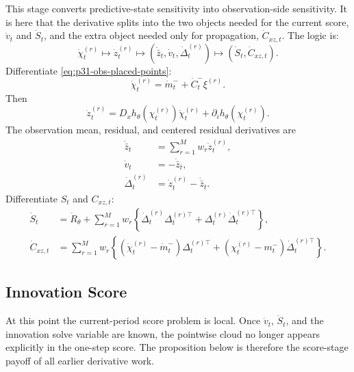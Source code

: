 \documentclass[11pt]{article}
\numberwithin{equation}{section}
\begin{document}
This stage converts predictive-state sensitivity into observation-side
sensitivity.  It is here that the derivative splits into the two objects needed
for the current score, \(\dot v_t\) and \(\dot S_t\), and the extra object
needed only for propagation, \(\dot C_{xz,t}\).  The logic is:
\begin{equation}
  \dot\chi_t^{(r)}
  \longmapsto
  \dot z_t^{(r)}
  \longmapsto
  (\dot{\bar z}_t,\dot v_t,\dot\Delta_t^{(r)})
  \longmapsto
  (\dot S_t,\dot C_{xz,t}).
  \label{eq:p32-observation-derivative-flow}
\end{equation}
Differentiate \eqref{eq:p31-obs-placed-points}:
\begin{equation}
  \dot\chi_t^{(r)}
  =
  \dot m_t^-+\dot C_t^-\xi^{(r)}.
  \label{eq:p31-dot-obs-place}
\end{equation}
Then
\begin{equation}
  \dot z_t^{(r)}
  =
  D_xh_\theta(\chi_t^{(r)})\dot\chi_t^{(r)}
  +\partial_i h_\theta(\chi_t^{(r)}).
  \label{eq:p31-dot-obs-value}
\end{equation}
The observation mean, residual, and centered residual derivatives are
\begin{align}
  \dot{\bar z}_t&=\sum_{r=1}^M w_r\dot z_t^{(r)},
  \label{eq:p31-dot-zbar}\\
  \dot v_t&=-\dot{\bar z}_t,
  \label{eq:p31-dot-v}\\
  \dot\Delta_t^{(r)}&=\dot z_t^{(r)}-\dot{\bar z}_t.
  \label{eq:p31-dot-Delta}
\end{align}
Differentiate \(S_t\) and \(C_{xz,t}\):
\begin{align}
  \dot S_t
  &=
  \dot R_\theta
  +
  \sum_{r=1}^M w_r
  \left\{
  \dot\Delta_t^{(r)}\Delta_t^{(r)\top}
  +\Delta_t^{(r)}\dot\Delta_t^{(r)\top}
  \right\},
  \label{eq:p31-dot-S}\\
  \dot C_{xz,t}
  &=
  \sum_{r=1}^M w_r
  \left\{
  (\dot\chi_t^{(r)}-\dot m_t^-)\Delta_t^{(r)\top}
  +(\chi_t^{(r)}-m_t^-)\dot\Delta_t^{(r)\top}
  \right\}.
  \label{eq:p31-dot-Cxz}
\end{align}

\subsection{Innovation Score}

At this point the current-period score problem is local.  Once \(\dot v_t\),
\(\dot S_t\), and the innovation solve variable are known, the pointwise cloud no
longer appears explicitly in the one-step score.  The proposition below is
therefore the score-stage payoff of all earlier derivative work.
\end{document}
